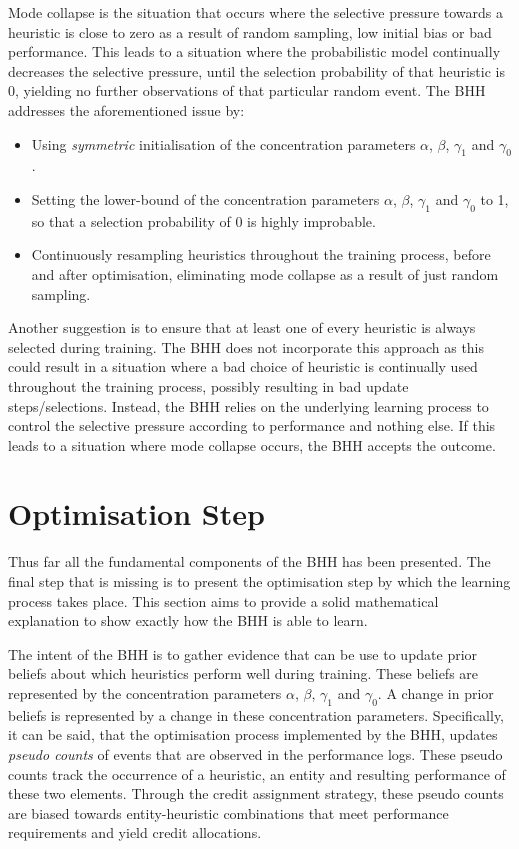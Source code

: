 Mode collapse is the situation that occurs where the selective pressure towards a heuristic is close to zero as a result of random sampling, low initial bias or bad performance. This leads to a situation where the probabilistic model continually decreases the selective pressure, until the selection probability of that heuristic is 0, yielding no further observations of that particular random event. The \acs{BHH} addresses the aforementioned issue by:

\begin{itemize}
      \item Using \textit{symmetric} initialisation of the concentration parameters $\alpha$, $\beta$, $\gamma_{1}$ and $\gamma_{0}$.

      \item Setting the lower-bound of the concentration parameters $\alpha$, $\beta$, $\gamma_{1}$ and $\gamma_{0}$ to 1, so that a selection probability of 0 is highly improbable.

      \item Continuously resampling heuristics throughout the training process, before and after optimisation, eliminating mode collapse as a result of just random sampling.
\end{itemize}

Another suggestion is to ensure that at least one of every heuristic is always selected during training. The \acs{BHH} does not incorporate this approach as this could result in a situation where a bad choice of heuristic is continually used throughout the training process, possibly resulting in bad update steps/selections. Instead, the \acs{BHH} relies on the underlying learning process to control the selective pressure according to performance and nothing else. If this leads to a situation where mode collapse occurs, the \acs{BHH} accepts the outcome.

\section{Optimisation Step}\label{sec:bhh:optimisation_step}

Thus far all the fundamental components of the \acs{BHH} has been presented. The final step that is missing is to present the optimisation step by which the learning process takes place. This section aims to provide a solid mathematical explanation to show exactly how the \acs{BHH} is able to learn.

The intent of the \acs{BHH} is to gather evidence that can be use to update prior beliefs about which heuristics perform well during training. These beliefs are represented by the concentration parameters $\alpha$, $\beta$, $\gamma_{1}$ and $\gamma_{0}$. A change in prior beliefs is represented by a change in these concentration parameters. Specifically, it can be said, that the optimisation process implemented by the \acs{BHH}, updates \textit{pseudo counts} of events that are observed in the performance logs. These pseudo counts track the occurrence of a heuristic, an entity and resulting performance of these two elements. Through the credit assignment strategy, these pseudo counts are biased towards entity-heuristic combinations that meet performance requirements and yield credit allocations.

